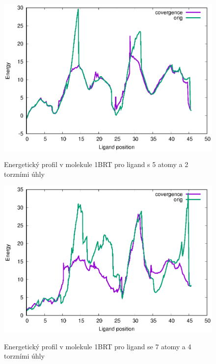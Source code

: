 \begin{figure}[ht]
\centering
\begin{minipage}{.49\textwidth}
  \centering
    \includegraphics[width=1\textwidth]{img/1BRT_energy_m004.eps}
    \caption{Energetický profil v molekule 1BRT pro ligand s 5 atomy a 2 torzními úhly}
  \centering
  \label{fig:1BRT_energy_0}
\end{minipage}%
\hfill
\begin{minipage}{.49\textwidth}
     \centering
    \includegraphics[width=1\textwidth]{img/1BRT_energy_m006.eps}
    \caption{Energetický profil v molekule 1BRT pro ligand se 7 atomy a 4 torzními úhly}
  \centering
  \label{fig:1BRT_energy_1}
\end{minipage}
\end{figure}


